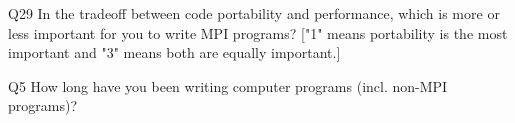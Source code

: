 \begin{description}%
\item{Q29} In the tradeoff between code portability and performance, which is more or less important for you to write MPI programs? ["1" means portability is the most important and "3" means both are equally important.]%
\item{Q5} How long have you been writing computer programs (incl. non-MPI programs)?%
\end{description}%
